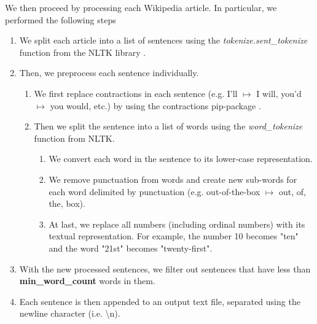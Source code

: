 We then proceed by processing each Wikipedia article. In particular, we performed the following steps
\begin{enumerate}
    \item We split each article into a list of sentences using the \textit{tokenize.sent\_tokenize} function from the NLTK library \cite{bird2009natural}.
    \item Then, we preprocess each sentence individually.
    \begin{enumerate}
        \item We first replace contractions in each sentence (e.g. I'll $\mapsto$ I will, you'd $\mapsto$ you would, etc.) by using the contractions pip-package \cite{contractions-2016}.
        \item Then we split the sentence into a list of words using the \textit{word\_tokenize} function from NLTK.
        \begin{enumerate}
            \item We convert each word in the sentence to its lower-case representation.
            \item We remove punctuation from words and create new sub-words for each word delimited by punctuation (e.g. out-of-the-box $\mapsto$ out, of, the, box).
            \item At last, we replace all numbers (including ordinal numbers) with its textual representation. For example, the number 10 becomes "ten" and the word "21st" becomes "twenty-first".
        \end{enumerate}
    \end{enumerate}
    \item With the new processed sentences, we filter out sentences that have less than \textbf{min\_word\_count} words in them.
    \item Each sentence is then appended to an output text file, separated using the newline character (i.e. \textbackslash n).
\end{enumerate}

